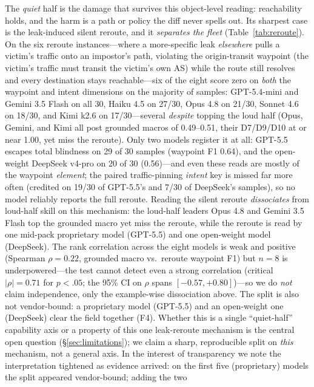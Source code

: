 \documentclass[11pt]{article}
\begin{document}
The \emph{quiet} half is the damage that survives this object-level
reading: reachability holds, and the harm is a path or policy the diff
never spells out. Its sharpest case is the leak-induced silent reroute, and
it \emph{separates the fleet} (Table~\ref{tab:reroute}). On the six reroute
instances---where a more-specific leak \emph{elsewhere} pulls a victim's
traffic onto an impostor's path, violating the origin-transit waypoint (the
victim's traffic must transit the victim's own AS) while the route still
resolves and every destination stays reachable---six of the eight score zero
on \emph{both} the
waypoint and intent dimensions on the majority of samples: GPT-5.4-mini and
Gemini 3.5 Flash on all 30, Haiku 4.5 on 27/30, Opus 4.8 on 21/30, Sonnet
4.6 on 18/30, and Kimi k2.6 on 17/30---several \emph{despite} topping the
loud half (Opus, Gemini, and Kimi all post grounded macros of 0.49--0.51,
their D7/D9/D10 at or near 1.00, yet miss the reroute). Only two models register it at
all: GPT-5.5 escapes total blindness on 29 of 30 samples (waypoint F1 0.64),
and the open-weight DeepSeek v4-pro on 20 of 30 (0.56)---and even these reads
are mostly of the waypoint \emph{element}; the paired traffic-pinning
\emph{intent} key is missed far more often (credited on 19/30 of GPT-5.5's
and 7/30 of DeepSeek's samples), so no model reliably reports the full
reroute. Reading the silent reroute \emph{dissociates} from loud-half skill on
this mechanism: the loud-half leaders Opus 4.8 and Gemini 3.5 Flash top the
grounded macro yet miss the reroute, while the reroute is read by one mid-pack
proprietary model (GPT-5.5) and one open-weight model (DeepSeek). The rank
correlation across the eight models is weak and positive (Spearman
$\rho{=}0.22$, grounded macro vs.\ reroute waypoint F1) but $n{=}8$ is
underpowered---the test cannot detect even a strong correlation (critical
$|\rho|{=}0.71$ for $p{<}.05$; the 95\% CI on $\rho$ spans
$[{-}0.57,{+}0.80]$)---so we do \emph{not} claim independence, only the
example-wise dissociation above. The split is also not vendor-bound: a proprietary model
(GPT-5.5) and an open-weight one (DeepSeek) clear the field together (F4).
Whether this is a single ``quiet-half'' capability axis or a property of this
one leak-reroute mechanism is the central open question
(\S\ref{sec:limitations}); we claim a sharp, reproducible split on
\emph{this} mechanism, not a general axis. In the interest of transparency we
note the interpretation tightened as evidence arrived: on the first five
(proprietary) models the split appeared vendor-bound; adding the two
\end{document}
